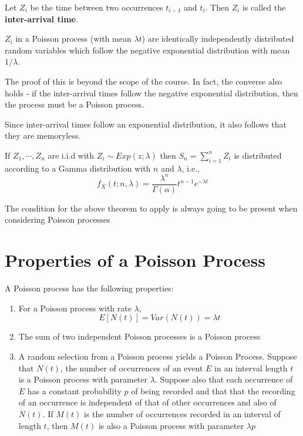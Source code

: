 \documentclass[12pt,letterpaper]{book}
\theoremstyle{definition}
\begin{document}
Let $Z_i$ be the time between two occurrences $t_{i-1}$ and $t_i$. Then $Z_i$ is called the \textbf{inter-arrival time}.

\begin{theorem}
  $Z_i$ in a Poisson process (with mean $\lambda t$) are identically independently distributed random variables which follow the negative exponential distribution with mean $1/\lambda$.
\end{theorem}

The proof of this is beyond the scope of the course. In fact, the converse also holds - if the inter-arrival times follow the negative exponential distribution, then the process must be a Poisson process.

Since inter-arrival times follow an exponential distribution, it also follows that they are memoryless.

\begin{lemma}
  If $Z_1, \cdots, Z_n$ are i.i.d with $Z_i \sim Exp(z;\lambda)$ then $S_n = \sum_{i = 1}^{n}  Z_i$ is distributed according to a Gamma distribution with $n$ and $\lambda$, i.e.,
  \[f_X(t;n,\lambda) = \frac{\lambda^n}{\Gamma (\alpha)} t^{n-1} e^{-\lambda t}\]
\end{lemma}

The condition for the above theorem to apply is always going to be present when considering Poisson processes

\section{Properties of a Poisson Process}

A Poisson process has the following properties:

\begin{enumerate}
  \item For a Poisson process with rate $\lambda$, 
    \[E[N(t)] = Var(N(t)) = \lambda t\]
  \item The sum of two independent Poisson processes is a Poisson process
  \item A random selection from a Poisson process yields a Poisson Process. Suppose that $N(t)$, the number of occurrences of an event $E$ in an interval length $t$ is a Poisson process with parameter $\lambda$. Suppose also that each occurrence of $E$ has a constant probability $p$ of being recorded and that that the recording of an occurrence is independent of that of other occurrences and also of $N(t)$. If $M(t)$ is the number of occurrences recorded in an interval of length $t$, then $M(t)$ is also a Poisson process with parameter $\lambda p$
\end{enumerate}
\end{document}
